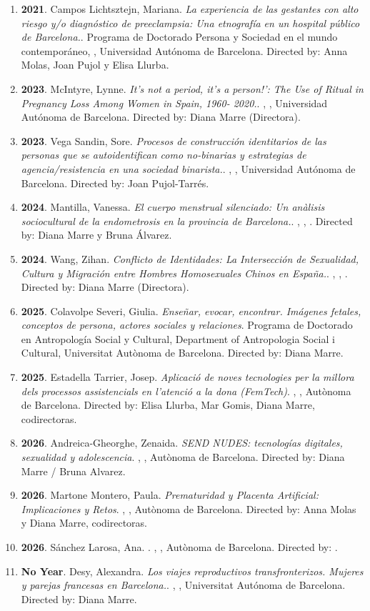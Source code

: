 \begin{enumerate}
\item {\bf 2021}. Campos Lichtsztejn, Mariana. {\it La experiencia de las gestantes con alto riesgo y/o diagnóstico de preeclampsia: Una etnografía en un hospital público de Barcelona.}. Programa de Doctorado Persona y Sociedad en el mundo contemporáneo, , Universidad Autónoma de Barcelona. Directed by: Anna Molas, Joan Pujol y Elisa Llurba.\filbreak
\item {\bf 2023}. McIntyre, Lynne. {\it It’s not a period, it’s a person!’: The Use of Ritual in Pregnancy Loss Among Women in Spain, 1960- 2020.}. , , Universidad Autónoma de Barcelona. Directed by: Diana Marre (Directora).\filbreak
\item {\bf 2023}. Vega Sandin, Sore. {\it Procesos de construcción identitarios de las personas que se autoidentifican como no-binarias y estrategias de agencia/resistencia en una sociedad binarista.}. , , Universidad Autónoma de Barcelona. Directed by: Joan Pujol-Tarrés.\filbreak
\item {\bf 2024}. Mantilla, Vanessa. {\it El cuerpo menstrual silenciado: Un anàlisis sociocultural de la endometrosis en la  provincia de Barcelona.}. , , . Directed by: Diana Marre y Bruna Álvarez.\filbreak
\item {\bf 2024}. Wang, Zihan. {\it Conflicto de Identidades: La Intersección de Sexualidad, Cultura y Migración entre Hombres Homosexuales Chinos en España.}. , , . Directed by: Diana Marre (Directora).\filbreak
\item {\bf 2025}. Colavolpe Severi, Giulia. {\it Enseñar, evocar, encontrar. Imágenes fetales, conceptos de persona, actores sociales y relaciones}. Programa de Doctorado en Antropología Social y Cultural, Department of Antropologia Social i Cultural, Universitat Autònoma de Barcelona. Directed by: Diana Marre.\filbreak
\item {\bf 2025}. Estadella Tarrier, Josep. {\it Aplicació de noves tecnologies per la millora dels processos assistencials en l’atenció a la dona (FemTech)}. , , Autònoma de Barcelona. Directed by: Elisa Llurba, Mar Gomis, Diana Marre, codirectoras.\filbreak
\item {\bf 2026}. Andreica-Gheorghe, Zenaida. {\it SEND NUDES: tecnologías digitales, sexualidad y adolescencia}. , , Autònoma de Barcelona. Directed by: Diana Marre / Bruna Alvarez.\filbreak
\item {\bf 2026}. Martone Montero, Paula. {\it Prematuridad y Placenta Artificial: Implicaciones y Retos}. , , Autònoma de Barcelona. Directed by: Anna Molas y Diana Marre, codirectoras.\filbreak
\item {\bf 2026}. Sánchez Larosa, Ana. {\it }. , , Autònoma de Barcelona. Directed by: .\filbreak
\item {\bf No Year}. Desy, Alexandra. {\it Los viajes reproductivos transfronterizos. Mujeres y parejas francesas en Barcelona.}. , , Universitat Autónoma de Barcelona. Directed by: Diana Marre.\filbreak
\end{enumerate} 
